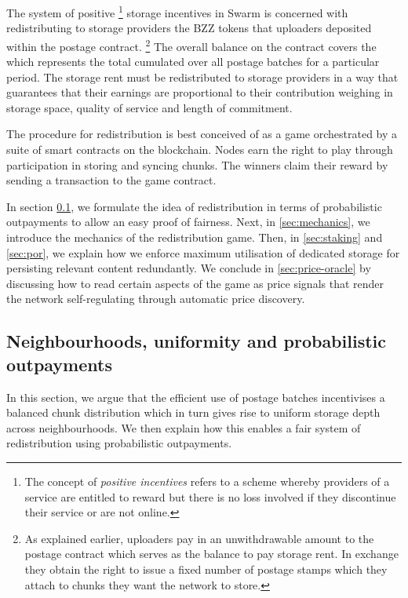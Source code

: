 The system of positive%
%
\footnote{The concept of \emph{positive incentives} refers to a scheme whereby providers of a service are entitled to reward but there is no loss involved if they discontinue their service or are not online.}
%
storage incentives in Swarm is concerned with redistributing  to storage providers the BZZ tokens that uploaders deposited within the postage contract.%
%
\footnote{As explained earlier, uploaders pay in an unwithdrawable amount to the postage contract which serves as the balance to pay storage rent. In exchange they obtain the right to issue a fixed number of postage stamps which they attach to chunks they want the network to store.}
%
The overall balance on the contract covers the  which represents the total  cumulated over all postage batches for a particular period. The storage rent must be redistributed to storage providers in a way that guarantees that their earnings are proportional to their contribution weighing in storage space, quality of service and length of commitment.

The procedure for redistribution is best conceived of as a game orchestrated by a suite of smart contracts on the blockchain. Nodes earn the right to play through participation in storing and syncing chunks. 
The winners claim their reward by sending a transaction to the game contract. 

In section \ref{sec:uniformity-pot}, we formulate the idea of redistribution in terms of probabilistic outpayments to allow an easy proof of fairness. Next, in \ref{sec:mechanics}, we introduce the mechanics of the redistribution game.
Then, in \ref{sec:staking} and \ref{sec:por}, we explain how we enforce maximum utilisation of dedicated storage for persisting  relevant content redundantly. We conclude in \ref{sec:price-oracle} by discussing how to read certain aspects of the game as price signals that render the network self-regulating through automatic price discovery. 

\subsection{Neighbourhoods, uniformity and probabilistic outpayments}\label{sec:uniformity-pot} 

In this section, we argue that the efficient use of postage batches incentivises a balanced chunk distribution which in turn gives rise to uniform storage depth across neighbourhoods. We then explain how this enables a fair system of redistribution using probabilistic outpayments.


